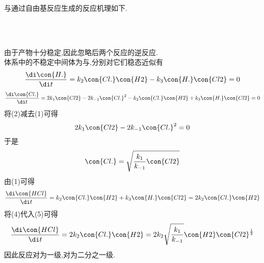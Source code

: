 \documentclass{ctexart}
\begin{document}
\begin{derivation}\setcounter{equation}{0}
    与通过自由基反应生成的反应机理如下.
    \begin{tightcenter}
        \\
        \\
    \end{tightcenter}
    由于产物十分稳定,因此忽略后两个反应的逆反应.\\
    体系中的不稳定中间体为与,分别对它们稳态近似有
    \begin{equation}
        \dfrac{\di\con{H.}}{\di t}=k_2\con{Cl.}\con{H2}-k_3\con{H.}\con{Cl2}=0
    \end{equation}
    \begin{equation}
        \dfrac{\di\con{Cl.}}{\di t}=2k_1\con{Cl2}-2k_{-1}\con{Cl.}^2-k_2\con{Cl.}\con{H2}+k_3\con{H.}\con{Cl2}=0
    \end{equation}
    将(2)减去(1)可得
    \begin{equation}
        2k_1\con{Cl2}-2k_{-1}\con{Cl.}^2=0
    \end{equation}
    于是
    \begin{equation}
        \con{Cl.}=\sqrt{\dfrac{k_1}{k_{-1}}\con{Cl2}}
    \end{equation}
    由(1)可得
    \begin{equation}
        \dfrac{\di\con{HCl}}{\di t}=k_2\con{Cl.}\con{H2}+k_3\con{H.}\con{Cl2}=2k_2\con{Cl.}\con{H2}
    \end{equation}
    将(4)代入(5)可得
    \begin{equation}
        \dfrac{\di\con{HCl}}{\di t}=2k_2\con{Cl.}\con{H2}=2k_2\sqrt{\dfrac{k_1}{k_{-1}}}\con{H2}\con{Cl2}^{\frac12}
    \end{equation}
    因此反应对为一级,对为二分之一级.
\end{derivation}
\end{document}
